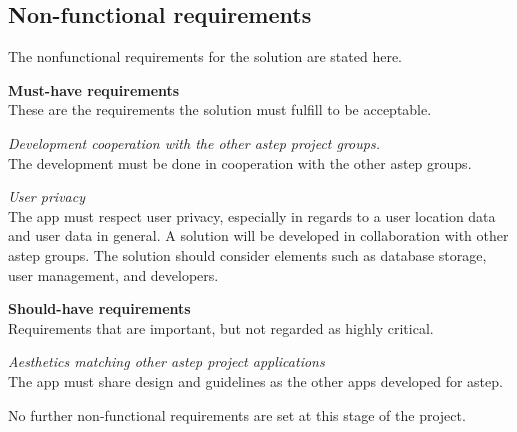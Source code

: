 \subsection{Non-functional requirements}
The nonfunctional requirements for the solution are stated here.

\textbf{Must-have requirements}\\
These are the requirements the solution must fulfill to be acceptable.

\textit{Development cooperation with the other \gls{astep} project groups.}\\
The development must be done in cooperation with the other \gls{astep} groups.

\textit{User privacy}\\
The app must respect user privacy, especially in regards to a user location data and user data in general.
A solution will be developed in collaboration with other \gls{astep} groups.
The solution should consider elements such as database storage, user management, and developers.

\textbf{Should-have requirements}\\
Requirements that are important, but not regarded as highly critical.

\textit{Aesthetics matching other \gls{astep} project applications}\\
The app must share design and guidelines as the other apps developed for \gls{astep}.

No further non-functional requirements are set at this stage of the project.